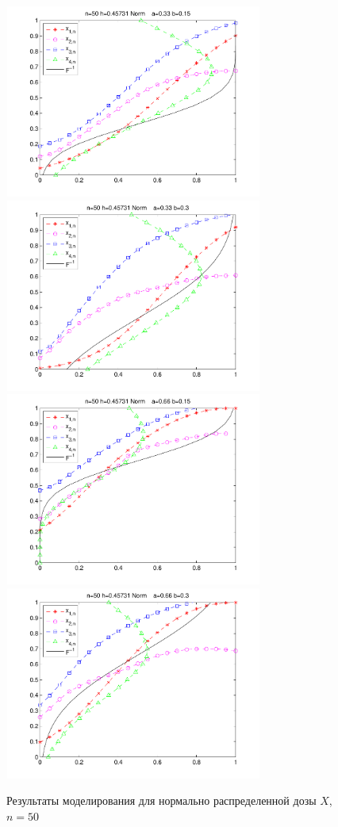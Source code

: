 \documentclass[a4paper,14pt,russian]{article}
\begin{document}
\begin{figure}[h]
\center
\caption{Результаты моделирования для нормально распределенной дозы $X$, $n=50$}
\includegraphics[width = 240pt,height = 180pt]{3.pdf}
\includegraphics[width = 240pt,height = 180pt]{4.pdf}
\includegraphics[width = 240pt,height = 180pt]{5.pdf}
\includegraphics[width = 240pt,height = 180pt]{6.pdf}

\end{figure}
\end{document}
